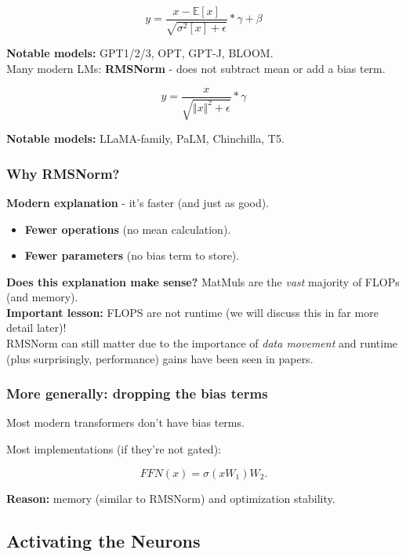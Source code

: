 \documentclass[12pt,twoside]{article}
\begin{document}
\[
    y = \frac{x - \mathbb{E}[x]}{\sqrt{\sigma^2[x] + \epsilon}} * \gamma + \beta
\]

\textbf{Notable models:} GPT1/2/3, OPT, GPT-J, BLOOM. \\

Many modern LMs: \textbf{RMSNorm} - does not subtract mean or add a bias term.

\[
    y = \frac{x}{\sqrt{\Vert x \Vert^2 + \epsilon}} * \gamma
\]

\textbf{Notable models: } LLaMA-family, PaLM, Chinchilla, T5.

\subsubsection*{Why RMSNorm?}

\textbf{Modern explanation} - it's faster (and just as good).

\begin{itemize}
    \item \textbf{Fewer operations} (no mean calculation).
    \item \textbf{Fewer parameters} (no bias term to store).
\end{itemize}

\textbf{Does this explanation make sense?} MatMuls are the \textit{vast} majority of FLOPs (and memory). \\

\textbf{Important lesson:} FLOPS are not runtime (we will discuss this in far more detail later)! \\

RMSNorm can still matter due to the importance of \textit{data movement} and runtime (plus surprisingly, performance) gains have been seen in papers.

\subsubsection*{More generally: dropping the bias terms}

\begin{remark}
    Most modern transformers don't have bias terms.
\end{remark}

Most implementations (if they're not gated):

\[
    FFN(x) = \sigma(xW_1)W_2.
\]

\textbf{Reason:} memory (similar to RMSNorm) and optimization stability. 

\subsection*{Activating the Neurons}
\end{document}
